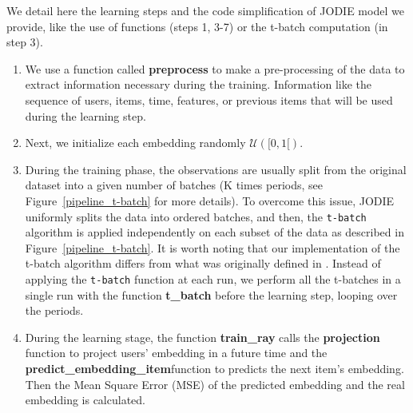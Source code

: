 We detail here the learning steps and the code simplification of JODIE model we provide, like the use of functions (steps 1, 3-7) or the t-batch computation (in step 3). 
\begin{enumerate}
    \item We use a function called \textbf{preprocess}\footnotemark[3] to make a pre-processing of the data to extract information necessary during the training. Information like the sequence of users, items, time, features, or previous items that will be used during the learning step.
    \item Next, we initialize each embedding randomly $\mathcal{U}([0,1[)$.
    \item During the training phase, the observations are usually split from the original dataset into a given number of batches (K times periods, see Figure~\ref{pipeline_t-batch} for more details). To overcome this issue, JODIE uniformly splits the data into ordered batches, and then, the \texttt{t-batch} algorithm is applied independently on each subset of the data as described in Figure~\ref{pipeline_t-batch}.  It is worth noting that our implementation of the t-batch algorithm differs from what was originally defined in \cite{kumar18}. Instead of applying the \texttt{t-batch} function at each run, we perform all the t-batches in a single run with the  function \textbf{t\_batch}\footnotemark[3] before the learning step, looping over the periods.


    \item During the learning stage,  the function \textbf{train\_ray}\footnotemark[4] calls  the \textbf{projection}\footnotemark[5] function to project users' embedding in a future time and the \textbf{predict\_embedding\_item}\footnotemark[5] function to predicts the next item's embedding. Then the Mean Square Error (MSE) of the predicted embedding and the real embedding is calculated.
    

\end{enumerate}
